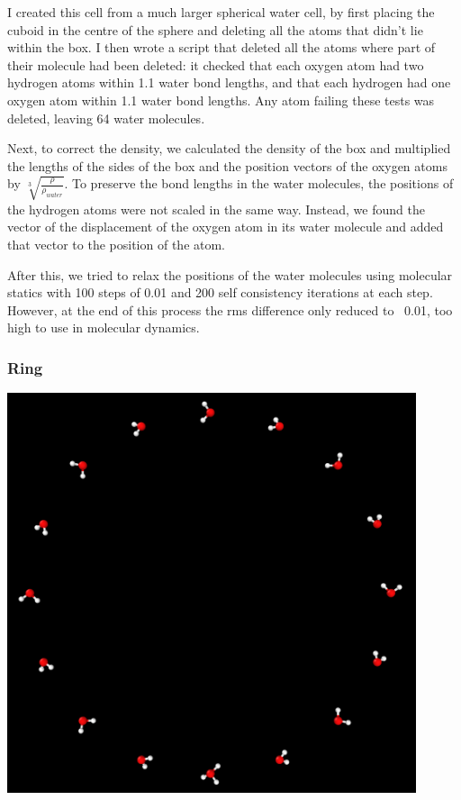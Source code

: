 \documentclass{article}
\newenvironment{Figure}{\par\medskip\noindent\minipage{\linewidth}}{\endminipage\par\medskip}
\begin{document}
\begin{multicols}{2}
I created this cell from a much larger spherical water cell,\cite{WaterXYZ} by first placing the cuboid in the centre of the sphere and deleting all the atoms that didn't lie within the box. I then wrote a script that deleted all the atoms where part of their molecule had been deleted: it checked that each oxygen atom had two hydrogen atoms within 1.1 water bond lengths, and that each hydrogen had one oxygen atom within 1.1 water bond lengths. Any atom failing these tests was deleted, leaving 64 water molecules.

Next, to correct the density, we calculated the density of the box and multiplied the lengths of the sides of the box and the position vectors of the oxygen atoms by $\sqrt[3]{\frac{\rho}{\rho_{water}}}$. To preserve the bond lengths in the water molecules, the positions of the hydrogen atoms were not scaled in the same way. Instead, we found the vector of the displacement of the oxygen atom in its water molecule and added that vector to the position of the atom.

After this, we tried to relax the positions of the water molecules using molecular statics with 100 steps of 0.01 and 200 self consistency iterations at each step. However, at the end of this process the rms difference only reduced to ~0.01, too high to use in molecular dynamics.

\subsubsection{Ring}
\label{sec:ring}
\begin{Figure}
	\centering
	\includegraphics[width=0.9\textwidth]{figures/circle}
	\label{fig:circle}	
\end{Figure}


\end{multicols}
\end{document}
